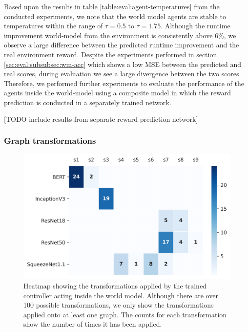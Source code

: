 Based upon the results in table \ref{table:eval:agent-temperatures} from the conducted experiments, we note that the world model agents are stable to temperatures within the range of $\tau = 0.5$ to $\tau = 1.75$. Although the runtime improvement world-model from the environment is consistently above 6\%, we observe a large difference between the predicted runtime improvement and the real environment reward. Despite the experiments performed in section \ref{sec:eval:subsubsec:wm-acc} which shows a low MSE between the predicted and real scores, during evaluation we see a large divergence between the two scores. Therefore, we performed further experiments to evaluate the performance of the agents inside the world-model using a composite model in which the reward prediction is conducted in a separately trained network.

[TODO include results from separate reward prediction network]

\subsubsection{Graph transformations}

\begin{figure}[ht]
  \centering
  \includegraphics[width=1\columnwidth]{sections/5evaluation/images/xfer_heatmap.png}
  \caption[Heatmap of graph transformations applied by MB controller]{Heatmap showing the transformations applied by the trained controller acting inside the world model. Although there are over 100 possible transformations, we only show the transformations applied onto at least one graph. The counts for each transformation show the number of times it has been applied.}
  \label{fig:eval:xfer-heatmap}
\end{figure}

